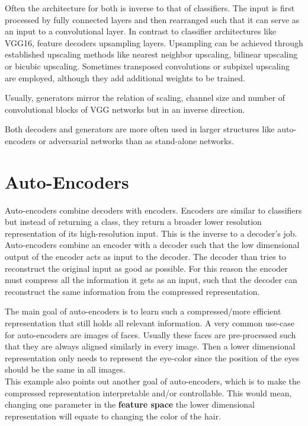 Often the architecture for both is inverse to that of classifiers.
The input is first processed by fully connected layers and then rearranged such that it can serve as an input to a convolutional layer.
In contrast to classifier architectures like VGG16, feature decoders upsampling layers.
Upsampling can be achieved through established upscaling methods like nearest neighbor upscaling, bilinear upscaling or bicubic upscaling.
Sometimes transposed convolutions or subpixel upscaling are employed, although they add additional weights to be trained.

Usually, generators mirror the relation of scaling, channel size and number of convolutional blocks of VGG networks but in an inverse direction.

Both decoders and generators are more often used in larger structures like auto-encoders or adversarial networks than as stand-alone networks.

\section{Auto-Encoders}
Auto-encoders combine decoders with encoders.
Encoders are similar to classifiers but instead of returning a class, they return a broader lower resolution representation of its high-resolution input.
This is the inverse to a decoder's job.
Auto-encoders combine an encoder with a decoder such that the low dimensional output of the encoder acts as input to the decoder.
The decoder than tries to reconstruct the original input as good as possible.
For this reason the encoder must compress all the information it gets as an input, such that the decoder can reconstruct the same information from the compressed representation.

The main goal of auto-encoders is to learn such a compressed/more efficient representation that still holds all relevant information.
A very common use-case for auto-encoders are images of faces.
Usually these faces are pre-processed such that they are always aligned similarly in every image.
Then a lower dimensional representation only needs to represent \eg the eye-color since the position of the eyes should be the same in all images.\\
This example also points out another goal of auto-encoders, which is to make the compressed representation interpretable and/or controllable.
This would mean, changing one parameter in the \textbf{feature space} \ie the lower dimensional representation will equate to changing the color of the hair.

